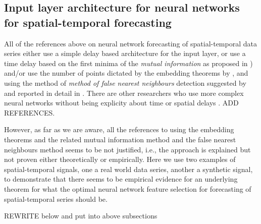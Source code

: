 \documentclass[journal]{IEEEtran}
\begin{document}
\subsection{Input layer architecture for neural networks for spatial-temporal forecasting}

All of the references above on neural network forecasting of spatial-temporal data series either use a simple delay based architecture
for the input layer, or use a time delay based on the first minima of the {\em mutual information} as proposed in
\cite{Fraser86, abarbanel1997analysis, opac-b1092652}) and/or use the number of points dictated by
the embedding theorems by \cite{key1503303m}, \cite{1981LNM...898..366T, 1981LNM...898..230M} and \cite{1991JSP....65..579S}
using the method of {\em method of false nearest neighbours} detection suggested by
\cite{1992PhRvA..45.3403K} and reported in detail in
\cite{1992PhRvA..45.7058M, 1993RvMP...65.1331A, 1996PhT....49k..86A, abarbanel1997analysis}. There are other researchers
who use more complex neural networks without being explicity about time or spatial delays \cite{2017arXiv171205293C}. ADD REFERENCES.

However, as far as we are aware, all the references to using the embedding theorems and the related  mutual information
method and the false nearest neighbours method seems to be not justified, i.e., the approach is explained but not proven
either theoretically or empirically. Here we use two examples of spatial-temporal signals, one a real world data series, another
a synthetic signal, to demonstrate that there seems to be empirical evidence for an underlying theorem for what the optimal
 neural network feature selection for forecasting of spatial-temporal series should be.


REWRITE below and put into above subsections
\\
\end{document}
